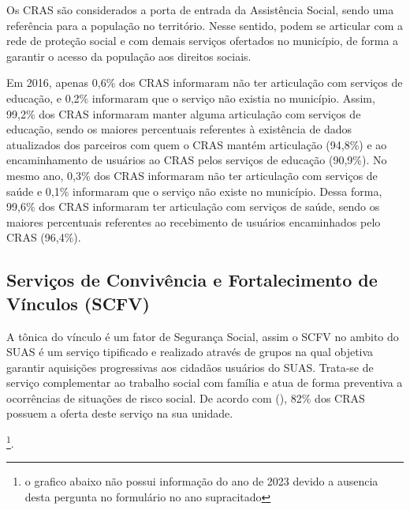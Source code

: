\documentclass[
  brazilian]{report}
\begin{document}
Os CRAS são considerados a porta de entrada da Assistência Social, sendo
uma referência para a população no território. Nesse sentido, podem se
articular com a rede de proteção social e com demais serviços ofertados
no município, de forma a garantir o acesso da população aos direitos
sociais.

Em 2016, apenas 0,6\% dos CRAS informaram não ter articulação com
serviços de educação, e 0,2\% informaram que o serviço não existia no
município. Assim, 99,2\% dos CRAS informaram manter alguma articulação
com serviços de educação, sendo os maiores percentuais referentes à
existência de dados atualizados dos parceiros com quem o CRAS mantém
articulação (94,8\%) e ao encaminhamento de usuários ao CRAS pelos
serviços de educação (90,9\%). No mesmo ano, 0,3\% dos CRAS informaram
não ter articulação com serviços de saúde e 0,1\% informaram que o
serviço não existe no município. Dessa forma, 99,6\% dos CRAS informaram
ter articulação com serviços de saúde, sendo os maiores percentuais
referentes ao recebimento de usuários encaminhados pelo CRAS (96,4\%).

\hypertarget{serviuxe7os-de-convivuxeancia-e-fortalecimento-de-vuxednculos-scfv}{%
\subsection{Serviços de Convivência e Fortalecimento de Vínculos
(SCFV)}\label{serviuxe7os-de-convivuxeancia-e-fortalecimento-de-vuxednculos-scfv}}

A tônica do vínculo é um fator de Segurança Social, assim o SCFV no
ambito do SUAS é um serviço tipificado e realizado através de grupos na
qual objetiva garantir aquisições progressivas aos cidadãos usuários do
SUAS. Trata-se de serviço complementar ao trabalho social com família e
atua de forma preventiva a ocorrências de situações de risco social. De
acordo com (), 82\% dos CRAS possuem a oferta deste
serviço na sua unidade.

\footnote{o grafico abaixo não possui informação do ano de 2023 devido a ausencia desta pergunta no formulário no ano supracitado}.
\end{document}

